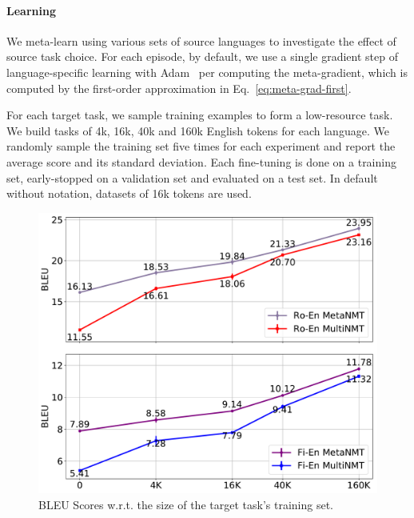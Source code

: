\paragraph{Learning}
We meta-learn using various sets of source languages to investigate the effect of source task choice. For each episode, by default, we use a single gradient step of language-specific learning with Adam~\citep{kingma2014adam} per computing the meta-gradient, which is computed by the first-order approximation in Eq.~\eqref{eq:meta-grad-first}. 

For each target task, we sample training examples to form a low-resource task. We build tasks of 4k, 16k, 40k and 160k English tokens for each language. We randomly sample the training set five times for each experiment and report the average score and its standard deviation. Each fine-tuning is done on a training set, early-stopped on a validation set and evaluated on a test set. In default without notation, datasets of 16k tokens are used.


\begin{figure}[tb]
    \centering
    \includegraphics[width=\linewidth]{figs/meta/support_size.pdf}
    \caption{BLEU Scores w.r.t. the size of the target task's training set.}
    \label{fig:support}
    \vspace{-10pt}
\end{figure}





